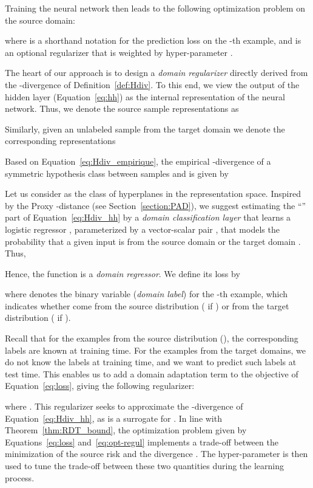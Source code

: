 \documentclass[twoside,11pt]{article}
\begin{document}
Training the neural network then leads to the following optimization problem on the source domain:

where  is a shorthand notation for the prediction loss on the -th example, and  is an optional regularizer that is weighted by hyper-parameter .
\medskip

The heart of our approach is to design a \emph{domain regularizer} directly derived from the -divergence of Definition~\ref{def:Hdiv}. To this end, we view the output of the hidden layer  (Equation~\ref{eq:hh}) as the internal representation of the neural network. 
Thus, we denote the source sample representations as 

Similarly, given  an unlabeled sample from the target domain
we denote the corresponding representations 

Based on Equation~\eqref{eq:Hdiv_empirique}, the empirical -divergence of a symmetric hypothesis class  between samples  and  is given by

Let us consider  as the class of hyperplanes in the representation space. Inspired by the Proxy -distance (see Section~\ref{section:PAD}), we suggest estimating the ``'' part of Equation~\eqref{eq:Hdiv_hh} by a \emph{domain classification layer}  that learns a logistic regressor , parameterized by a vector-scalar pair , that models the probability that a given input is from the source domain  or the target domain .
Thus,

Hence, the function  is a \emph{domain regressor}.
We define its loss by
 
where  denotes the binary variable ({\em domain label}) for the -th example, which indicates whether  come from the source distribution ( if ) or from the target distribution ( if ).

Recall that for the examples from the source distribution (), the corresponding labels  are known at training time. For the examples from the target domains, we do not know the labels at training time, and we want to predict such labels at test time.
This enables us to add a domain adaptation term to the objective of Equation~\eqref{eq:loss}, giving 
the following 
regularizer:

where
. 
 This regularizer seeks to approximate the -divergence 
of Equation~\eqref{eq:Hdiv_hh}, as 
  is a surrogate for .
In line with Theorem~\ref{thm:RDT_bound}, the optimization problem given by Equations~\eqref{eq:loss} and~\eqref{eq:opt-regul} implements a trade-off between the minimization of the source risk  and the divergence . The hyper-parameter  is then used to tune the trade-off between these two quantities during the learning process.
\end{document}

